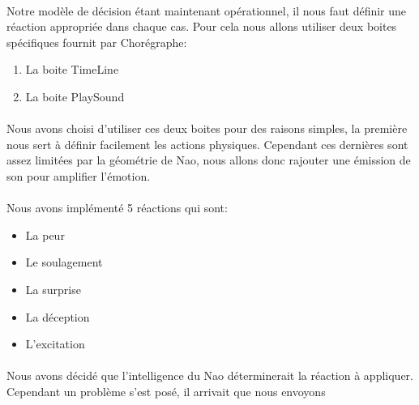 \paragraph{}
Notre modèle de décision étant maintenant opérationnel, il nous faut définir une
réaction appropriée dans chaque cas. Pour cela nous allons utiliser deux boites
spécifiques fournit par Chorégraphe:\\
\begin{enumerate}
  \item La boite TimeLine
  \item La boite PlaySound
\end{enumerate}

\paragraph{}
Nous avons choisi d'utiliser ces deux boites pour des raisons simples, la
première nous sert à définir facilement les actions physiques. Cependant ces
dernières sont assez limitées par la géométrie de Nao, nous allons donc rajouter
une émission de son pour amplifier l'émotion.

\paragraph{}
Nous avons implémenté 5 réactions qui sont:\\
\begin{itemize}
  \item La peur
  \item Le soulagement
  \item La surprise
  \item La déception
  \item L'excitation
\end{itemize}


\paragraph{}
Nous avons décidé que l'intelligence du Nao déterminerait la réaction à
appliquer. Cependant un problème s'est posé, il arrivait que nous envoyons 
